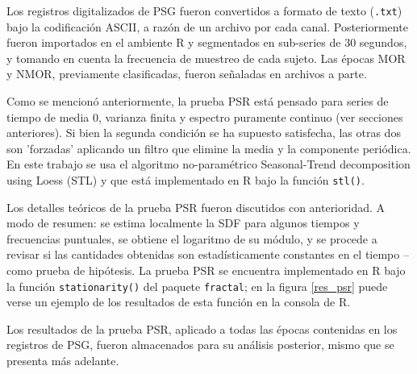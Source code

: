 \documentclass[12pt,a4paper]{mitthesis}
\begin{document}
Los registros digitalizados de PSG fueron convertidos a formato de texto (\texttt{.txt}) bajo la 
codificaci\'on ASCII, a raz\'on de un archivo por cada canal. Posteriormente fueron importados en 
el ambiente R y segmentados en sub-series de 30 segundos, y tomando en cuenta la frecuencia de
muestreo de cada sujeto. 
Las \'epocas MOR y NMOR, previamente clasificadas, fueron se\~naladas en archivos a parte.

Como se mencion\'o anteriormente, la prueba PSR est\'a pensado para series de tiempo de media 0, 
varianza finita y espectro puramente continuo (ver secciones anteriores). Si bien la segunda 
condici\'on se ha supuesto satisfecha, las otras dos son 'forzadas' aplicando  un filtro que 
elimine la media y la componente peri\'odica.
En este trabajo se usa el algoritmo no-param\'etrico Seasonal-Trend decomposition using Loess 
(STL) \cite{Cleveland1990} y que est\'a implementado en R bajo la funci\'on \texttt{stl()}.

Los detalles te\'oricos de la prueba PSR fueron discutidos con anterioridad. A modo de resumen: se 
estima localmente la SDF para algunos tiempos y frecuencias puntuales, se obtiene el logaritmo de
su m\'odulo, y se procede a revisar si las cantidades obtenidas son estad\'isticamente constantes
en el tiempo --como prueba de hip\'otesis.
La prueba PSR se encuentra implementado en R bajo la funci\'on \texttt{stationarity()} del paquete 
\texttt{fractal}; en la figura \ref{res_psr} puede verse un ejemplo de los resultados de esta 
funci\'on en la consola de R.

Los resultados de la prueba PSR, aplicado a todas las \'epocas contenidas en los registros de PSG,
fueron almacenados para su an\'alisis posterior, mismo que se presenta m\'as adelante.
\end{document}
